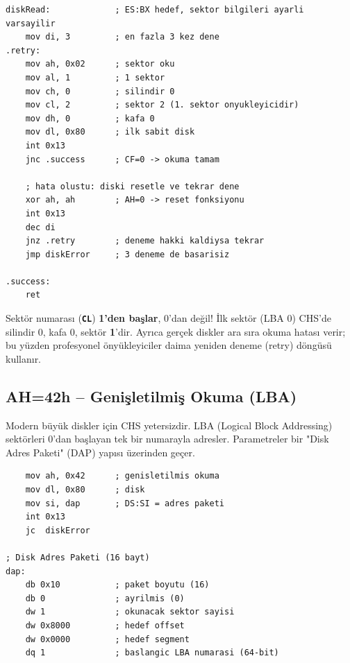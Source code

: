\documentclass[11pt,a4paper]{article}
\newcommand{\reg}[1]{\texttt{\color{anaMavi}\textbf{#1}}}
\begin{document}
\begin{ornekkutu}
\begin{lstlisting}
diskRead:             ; ES:BX hedef, sektor bilgileri ayarli varsayilir
    mov di, 3         ; en fazla 3 kez dene
.retry:
    mov ah, 0x02      ; sektor oku
    mov al, 1         ; 1 sektor
    mov ch, 0         ; silindir 0
    mov cl, 2         ; sektor 2 (1. sektor onyukleyicidir)
    mov dh, 0         ; kafa 0
    mov dl, 0x80      ; ilk sabit disk
    int 0x13
    jnc .success      ; CF=0 -> okuma tamam

    ; hata olustu: diski resetle ve tekrar dene
    xor ah, ah        ; AH=0 -> reset fonksiyonu
    int 0x13
    dec di
    jnz .retry        ; deneme hakki kaldiysa tekrar
    jmp diskError     ; 3 deneme de basarisiz

.success:
    ret
\end{lstlisting}
\end{ornekkutu}

\begin{uyarikutu}
Sektör numarası (\reg{CL}) \textbf{1'den başlar}, 0'dan değil! İlk sektör (LBA 0)
CHS'de silindir 0, kafa 0, sektör \textbf{1}'dir. Ayrıca gerçek diskler ara
sıra okuma hatası verir; bu yüzden profesyonel önyükleyiciler daima yeniden
deneme (retry) döngüsü kullanır.
\end{uyarikutu}

\subsection{AH=42h -- Genişletilmiş Okuma (LBA)}

Modern büyük diskler için CHS yetersizdir. LBA (Logical Block Addressing)
sektörleri 0'dan başlayan tek bir numarayla adresler. Parametreler bir
"Disk Adres Paketi" (DAP) yapısı üzerinden geçer.

\begin{ornekkutu}
\begin{lstlisting}
    mov ah, 0x42      ; genisletilmis okuma
    mov dl, 0x80      ; disk
    mov si, dap       ; DS:SI = adres paketi
    int 0x13
    jc  diskError

; Disk Adres Paketi (16 bayt)
dap:
    db 0x10           ; paket boyutu (16)
    db 0              ; ayrilmis (0)
    dw 1              ; okunacak sektor sayisi
    dw 0x8000         ; hedef offset
    dw 0x0000         ; hedef segment
    dq 1              ; baslangic LBA numarasi (64-bit)
\end{lstlisting}
\end{ornekkutu}
\end{document}
